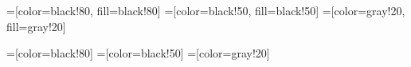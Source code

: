 \usetikzlibrary{patterns}
\usetikzlibrary{shapes,arrows}
\usetikzlibrary{decorations.pathreplacing, positioning}

=[color=black!80, fill=black!80]
=[color=black!50, fill=black!50]
=[color=gray!20, fill=gray!20]

=[color=black!80]
=[color=black!50]
=[color=gray!20]

